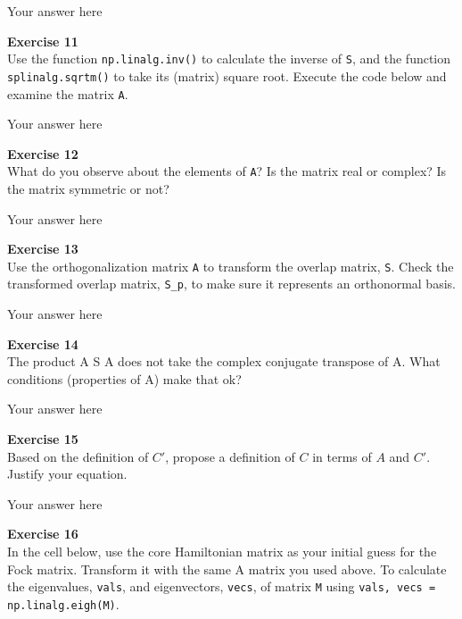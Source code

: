 \documentclass{article}
\begin{document}
Your answer here

\begin{mdframed}
\textbf{Exercise 11}\\
Use the function \texttt{np.linalg.inv()} to calculate the inverse of \texttt{S}, and the function \texttt{splinalg.sqrtm()} to take its (matrix) square root. Execute the code below and examine the matrix \texttt{A}.
\end{mdframed}

Your answer here

\begin{mdframed}
\textbf{Exercise 12}\\
What do you observe about the elements of \texttt{A}? Is the matrix real or complex? Is the matrix symmetric or not?
\end{mdframed}

Your answer here

\begin{mdframed}
\textbf{Exercise 13}\\
Use the orthogonalization matrix \texttt{A} to transform the overlap matrix, \texttt{S}. Check the transformed overlap matrix, \texttt{S\_p}, to make sure it represents an orthonormal basis.
\end{mdframed}

Your answer here

\begin{mdframed}
\textbf{Exercise 14}\\
The product A S A does not take the complex conjugate transpose of A. What conditions (properties of A) make that ok?
\end{mdframed}

Your answer here

\begin{mdframed}
\textbf{Exercise 15}\\
Based on the definition of $C'$, propose a definition of $C$ in terms of $A$ and $C'$. Justify your equation.
\end{mdframed}

Your answer here

\begin{mdframed}
\textbf{Exercise 16}\\
In the cell below, use the core Hamiltonian matrix as your initial guess for the Fock matrix. Transform it with the same A matrix you used above.  To calculate the eigenvalues, \texttt{vals}, and eigenvectors, \texttt{vecs}, of matrix \texttt{M} using  \texttt{vals, vecs = np.linalg.eigh(M)}.
\end{mdframed}
\end{document}
